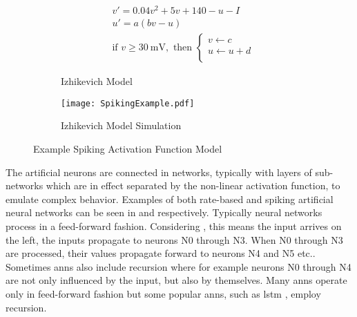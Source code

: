 \begin{figure}
\centering
\captionsetup{justification=centering}
\vspace{0.5cm}
\begin{subfigure}{.9\textwidth}
  \centering
  \begin{equation}
    \begin{split}
    &v' = 0.04v^2+5v + 140 - u - I\\
    &u' = a(bv-u)  \\
    &\text{if } v\ge  \SI{30}{\mV}, \text{ then } 
    \begin{cases}
        v \leftarrow c\\           
        u \leftarrow u+d\\           
    \end{cases} \nonumber
    \end{split}
  \end{equation}
  \caption{Izhikevich Model\cite{Iz2005}}
  \label{fig:Izhikevich Model}
  \end{subfigure}
\begin{subfigure}{.7\textwidth}
  \centering
  \mbox{\texttt{[image: SpikingExample.pdf]}}
  \captionsetup{justification=centering, skip=3pt}
  \caption{Izhikevich Model Simulation \cite{carnevale2006neuron}\cite{Iz2005}}
  \label{fig:spiking example}
\end{subfigure}
\caption{Example Spiking Activation Function Model}
\label{fig:Example Spiking Model}
\end{figure}

The artificial neurons are connected in networks, typically with layers of sub-networks which are in effect separated by the non-linear activation function, to emulate complex behavior.
Examples of both rate-based and spiking artificial neural networks can be seen in  and  respectively.
Typically neural networks process in a feed-forward fashion. Considering , this means the input arrives on the left, the inputs propagate to neurons N0 through N3. 
When N0 through N3 are processed, their values propagate forward to neurons N4 and N5 etc.. Sometimes \ac{ann}s also include recursion where for example neurons N0 through N4 are not only influenced
by the input, but also by themselves. Many \ac{ann}s operate only in feed-forward fashion but some popular \ac{ann}s, such as \ac{lstm} \cite{hochreiter1997long}, employ recursion.

